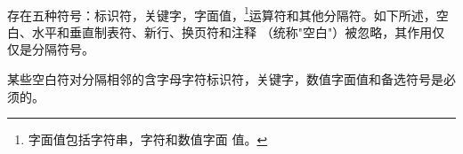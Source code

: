 
\paragraph{} %
存在五种符号：标识符，关键字，字面值，\footnote{字面值包括字符串，字符和数值字面
值。}运算符和其他分隔符。如下所述，空白、水平和垂直制表符、新行、换页符和注释
（统称"空白"）被忽略，其作用仅仅是分隔符号。

\begin{note}
  某些空白符对分隔相邻的含字母字符标识符，关键字，数值字面值和备选符号是必须的。
\end{note}

